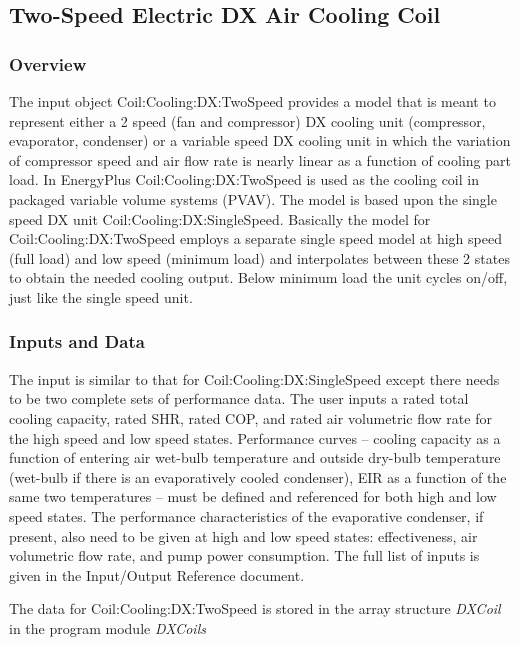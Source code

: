 \subsection{Two-Speed Electric DX Air Cooling Coil}\label{two-speed-electric-dx-air-cooling-coil}

\subsubsection{Overview}\label{overview-3-003}

The input object Coil:Cooling:DX:TwoSpeed provides a model that is meant to represent either a 2 speed (fan and compressor) DX cooling unit (compressor, evaporator, condenser) or a variable speed DX cooling unit in which the variation of compressor speed and air flow rate is nearly linear as a function of cooling part load. In EnergyPlus Coil:Cooling:DX:TwoSpeed is used as the cooling coil in packaged variable volume systems (PVAV). The model is based upon the single speed DX unit Coil:Cooling:DX:SingleSpeed. Basically the model for Coil:Cooling:DX:TwoSpeed employs a separate single speed model at high speed (full load) and low speed (minimum load) and interpolates between these 2 states to obtain the needed cooling output. Below minimum load the unit cycles on/off, just like the single speed unit.

\subsubsection{Inputs and Data}\label{inputs-and-data-001}

The input is similar to that for Coil:Cooling:DX:SingleSpeed except there needs to be two complete sets of performance data. The user inputs a rated total cooling capacity, rated SHR, rated COP, and rated air volumetric flow rate for the high speed and low speed states. Performance curves -- cooling capacity as a function of entering air wet-bulb temperature and outside dry-bulb temperature (wet-bulb if there is an evaporatively cooled condenser), EIR as a function of the same two temperatures -- must be defined and referenced for both high and low speed states. The performance characteristics of the evaporative condenser, if present, also need to be given at high and low speed states: effectiveness, air volumetric flow rate, and pump power consumption. The full list of inputs is given in the Input/Output Reference document.

The data for Coil:Cooling:DX:TwoSpeed is stored in the array structure \emph{DXCoil} in the program module \emph{DXCoils}

